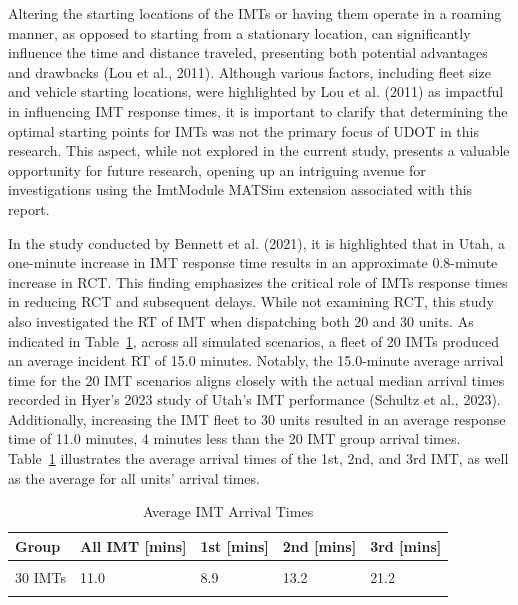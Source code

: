 \documentclass[fancy, oneside, mastersfancy, ms]{byuthesis}
\begin{document}
Altering the starting locations of the IMTs or having them operate in a
roaming manner, as opposed to starting from a stationary location, can
significantly influence the time and distance traveled, presenting both
potential advantages and drawbacks (Lou et al., 2011). Although various
factors, including fleet size and vehicle starting locations, were
highlighted by Lou et al. (2011) as impactful in influencing IMT
response times, it is important to clarify that determining the optimal
starting points for IMTs was not the primary focus of UDOT in this
research. This aspect, while not explored in the current study, presents
a valuable opportunity for future research, opening up an intriguing
avenue for investigations using the ImtModule MATSim extension
associated with this report.

In the study conducted by Bennett et al. (2021), it is highlighted that
in Utah, a one-minute increase in IMT response time results in an
approximate 0.8-minute increase in RCT. This finding emphasizes the
critical role of IMTs response times in reducing RCT and subsequent
delays. While not examining RCT, this study also investigated the RT of
IMT when dispatching both 20 and 30 units. As indicated in
Table~\ref{tbl-truck-arrival-table}, across all simulated scenarios, a
fleet of 20 IMTs produced an average incident RT of 15.0 minutes.
Notably, the 15.0-minute average arrival time for the 20 IMT scenarios
aligns closely with the actual median arrival times recorded in Hyer's
2023 study of Utah's IMT performance (Schultz et al., 2023).
Additionally, increasing the IMT fleet to 30 units resulted in an
average response time of 11.0 minutes, 4 minutes less than the 20 IMT
group arrival times. Table~\ref{tbl-truck-arrival-table} illustrates the
average arrival times of the 1st, 2nd, and 3rd IMT, as well as the
average for all units' arrival times.

\hypertarget{tbl-truck-arrival-table}{}
\begin{table}
\caption{\label{tbl-truck-arrival-table}Average IMT Arrival Times }\tabularnewline

\centering
\begin{tabular}[t]{lllll}
\toprule
\textbf{Group} & \textbf{All IMT [mins]} & \textbf{1st [mins]} & \textbf{2nd [mins]} & \textbf{3rd [mins]}\\
\midrule
\cellcolor{gray!6}{20 IMTs} & \cellcolor{gray!6}{15.0} & \cellcolor{gray!6}{11.1} & \cellcolor{gray!6}{21.1} & \cellcolor{gray!6}{28.9}\\
30 IMTs & 11.0 & 8.9 & 13.2 & 21.2\\
\cellcolor{gray65}{\cellcolor{gray!6}{Number of Incidents}} & \cellcolor{gray65}{\cellcolor{gray!6}{280}} & \cellcolor{gray65}{\cellcolor{gray!6}{280}} & \cellcolor{gray65}{\cellcolor{gray!6}{116}} & \cellcolor{gray65}{\cellcolor{gray!6}{23}}\\
\bottomrule
\end{tabular}
\end{table}
\end{document}
